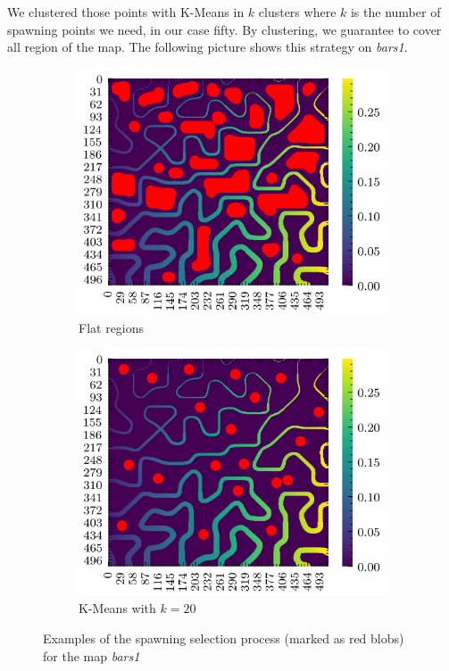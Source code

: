 \documentclass[../document.tex]{subfiles}
\begin{document}
We clustered those points with K-Means in $k$ clusters where $k$ is the number of spawning points we need, in our case fifty. By clustering, we guarantee to cover all region of the map. The following picture shows this strategy on \emph{bars1}. 
\begin{figure}[H]
    \begin{subfigure}[b]{0.5\textwidth}
        \includegraphics[width=\textwidth]{../img/3/spawn/flat-spawn-10.png}
        \caption{Flat regions}
    \end{subfigure}
    \begin{subfigure}[b]{0.5\textwidth}
        \includegraphics[width=\textwidth]{../img/3/spawn/spawn-10.png}
        \caption{K-Means with $k=20$}
    \end{subfigure}  
\label{fig: spawn-strat}
\caption{Examples of the spawning selection process (marked as red blobs) for the map \emph{bars1} }   
\end{figure}
\end{document}
